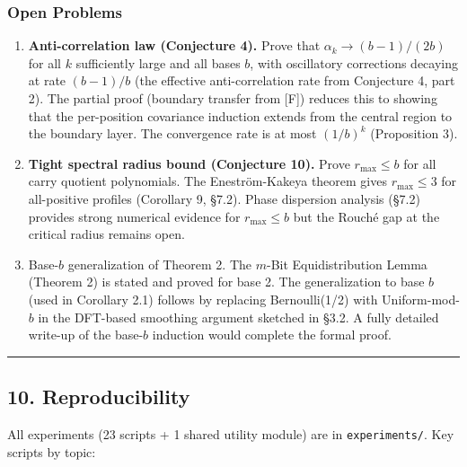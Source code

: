 \documentclass[
  11pt,
]{article}
\begin{document}
\subsubsection{Open Problems}\label{open-problems}

\begin{enumerate}
\def\labelenumi{\arabic{enumi}.}
\item
  \textbf{Anti-correlation law (Conjecture 4).} Prove that
  \(\alpha_k \to (b-1)/(2b)\) for all \(k\) sufficiently large and all bases
  \(b\), with oscillatory corrections decaying at rate \((b-1)/b\) (the
  effective anti-correlation rate from Conjecture 4, part 2). The partial proof
  (boundary transfer from {[}F{]}) reduces this to showing that the per-position
  covariance induction extends from the central region to the boundary layer.
  The convergence rate is at most \((1/b)^k\) (Proposition 3).
\item
  \textbf{Tight spectral radius bound (Conjecture 10).} Prove
  \(r_{\max} \leq b\) for all carry quotient polynomials. The Eneström-Kakeya
  theorem gives \(r_{\max} \leq 3\) for all-positive profiles (Corollary 9,
  §7.2). Phase dispersion analysis (§7.2) provides strong numerical evidence for
  \(r_{\max} \leq b\) but the Rouché gap at the critical radius remains open.
\item
  Base-\(b\) generalization of Theorem 2. The \(m\)-Bit Equidistribution Lemma
  (Theorem 2) is stated and proved for base 2. The generalization to base \(b\)
  (used in Corollary 2.1) follows by replacing Bernoulli(1/2) with
  Uniform-mod-\(b\) in the DFT-based smoothing argument sketched in §3.2. A
  fully detailed write-up of the base-\(b\) induction would complete the formal
  proof.
\end{enumerate}

\begin{center}\rule{0.5\linewidth}{0.5pt}\end{center}

\newpage

\subsection{10. Reproducibility}\label{reproducibility}

All experiments (23 scripts + 1 shared utility module) are in
\texttt{experiments/}. Key scripts by topic:
\end{document}
